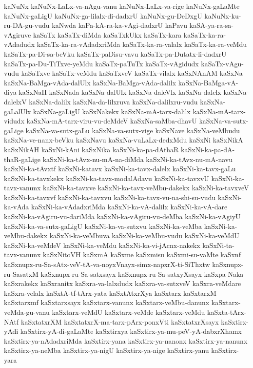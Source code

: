 {kaNuNx
kaNuNx-LaLx-va-nAgu-vanu
kaNuNx-LaLx-va-rige
kaNuNx-gaLaMte
kaNuNx-gaLigU
kaNuNx-ga-lilalx-di-dadxrU
kaNuNx-gu-DeDxgU
kaNuNx-ku-ru-DA-gu-vudu
kaNwda
kaPa-kA-ra-ka-vAgi-dadxrU
kaPavu
kaSA-ya-ra-sa-vAgiruve
kaSaTx
kaSaTx-diMda
kaSaTxkUkx
kaSaTx-kara
kaSaTx-ka-ra-vAdadudx
kaSaTx-ka-ra-vAdadxriMda
kaSaTx-ka-ra-valalx
kaSaTx-ka-ra-veMdu
kaSaTx-pa-Di-sa-beVku
kaSaTx-paDisu-vavu
kaSaTx-pa-Dutatx-li-dadxrU
kaSaTx-pa-Du-TiTxve-yeMdu
kaSaTx-paTuTx
kaSaTx-vAgidudx
kaSaTx-vAgu-vudu
kaSaTxve
kaSaTx-veMdu
kaSaTxveV
kaSaTx-vilalx
kaSxNAnAM
kaSxNa
kaSxNa-BaMga-vAda-dalUlx
kaSxNa-BaMga-vAda-dalilx
kaSxNa-BaMga-vA-diya
kaSxNaH
kaSxNada
kaSxNa-dalUlx
kaSxNa-daleVlx
kaSxNa-dalelx
kaSxNa-dalelxV
kaSxNa-dalilx
kaSxNa-da-lilxruva
kaSxNa-dalilxru-vudu
kaSxNa-gaLalUlx
kaSxNa-gaLigU
kaSxNakekx
kaSxNa-mA-tarx-dalilx
kaSxNa-mA-tarx-vidudx
kaSxNa-mA-tarx-viru-vu-deMdeV
kaSxNa-saMba-dhavU
kaSxNa-va-sutx-gaLige
kaSxNa-va-sutx-gaLu
kaSxNa-va-sutx-vige
kaSxNave
kaSxNa-veMbudu
kaSxNa-ve-nanx-beVku
kaSxNavu
kaSxNa-vuLaLx-dedxMdu
kaSxNi
kaSxNikA
kaSxNikAH
kaSxNi-kAni
kaSxNika
kaSxNi-ka-pa-dAthaR
kaSxNi-ka-pa-dA-thaR-gaLige
kaSxNi-ka-tAvx-nu-mA-na-diMda
kaSxNi-ka-tAvx-nu-mA-navu
kaSxNi-ka-tAvxtf
kaSxNi-katavx
kaSxNi-ka-tavx-dalelx
kaSxNi-ka-tavx-gaLu
kaSxNi-ka-tavxkekx
kaSxNi-ka-tavx-modalAdavu
kaSxNi-ka-tavxvU
kaSxNi-ka-tavx-vanunx
kaSxNi-ka-tavxve
kaSxNi-ka-tavx-veMbu-dakekx
kaSxNi-ka-tavxveV
kaSxNi-ka-tavxvf
kaSxNi-ka-tavxvu
kaSxNi-ka-tavx-vu-na-shi-su-vudu
kaSxNi-ka-vAda
kaSxNi-ka-vAdadxriMda
kaSxNi-ka-vA-dalilx
kaSxNi-ka-vA-dare
kaSxNi-ka-vAgiru-vu-dariMda
kaSxNi-ka-vAgiru-vu-deMba
kaSxNi-ka-vAgiyU
kaSxNi-ka-va-sutx-gaLigU
kaSxNi-ka-va-sutxvu
kaSxNi-ka-veMba
kaSxNi-ka-veMbu-dakekx
kaSxNi-ka-veMbuva
kaSxNi-ka-veMbu-vudu
kaSxNi-ka-veMdU
kaSxNi-ka-veMdeV
kaSxNi-ka-veMdu
kaSxNi-ka-vi-jAcnx-nakekx
kaSxNi-ta-tavx-vanunx
kaSxNitoVH
kaSxmA
kaSxme
kaSxmisu
kaSxmi-su-vaMte
kaSxnf
kaSxnupx-ru-Sa-sAtx-veV-tA-va-noyxVnayx-simx-napxrX-ti-SiThxtw
kaSxnupx-ru-SasatxM
kaSxnupx-ru-Sa-satxsayx
kaSxnupx-ru-Sa-satxyXsayx
kaSxpa-Naka
kaSxrakekx
kaSxranitx
kaSxra-va-lalxdudx
kaSxra-va-sutxveV
kaSxra-veMdare
kaSxra-velalx
kaSxtA-tf-tArx-yata
kaSxtAtxrXya
kaSxtarx
kaSxtarxM
kaSxtarxmf
kaSxtarxsayx
kaSxtarx-vanunx
kaSxtarx-veMbu-danunx
kaSxtarx-veMda-gu-vanu
kaSxtarx-veMdU
kaSxtarx-veMde
kaSxtarx-veMdu
kaSxta-tArx-NAtf
kaSxtatxrXM
kaSxtatxrX-ma-tarx-pArx-ponxVti
kaSxtatxrXsayx
kaSxtirx-yAdi
kaSxtirx-yA-di-gaLaMte
kaSxtirxya
kaSxtirx-ya-mu-peV-yA-dabxrXhamx
kaSxtirx-ya-nAdadxriMda
kaSxtirx-yana
kaSxtirx-ya-nanonx
kaSxtirx-ya-nanunx
kaSxtirx-ya-neMba
kaSxtirx-ya-nigU
kaSxtirx-ya-nige
kaSxtirx-yanu
kaSxtirx-yara
}
